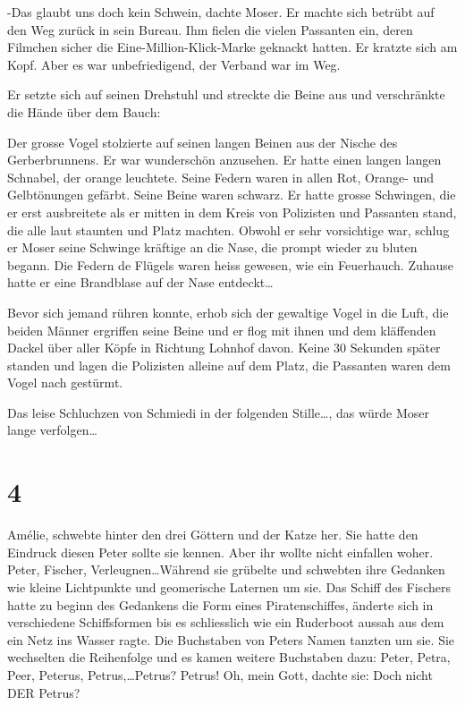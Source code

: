 \documentclass[11pt,titlepage,a5paper]{book}
\begin{document}
-Das glaubt uns doch kein Schwein, dachte Moser. Er machte sich betrübt auf den Weg zurück in sein Bureau. Ihm fielen die vielen Passanten ein, deren Filmchen sicher die Eine-Million-Klick-Marke geknackt hatten. Er kratzte sich am Kopf. Aber es war unbefriedigend, der Verband war im Weg.

Er setzte sich auf seinen Drehstuhl und streckte die Beine aus und verschränkte die Hände über dem Bauch: 

Der grosse Vogel stolzierte auf seinen langen Beinen aus der Nische des Gerberbrunnens. Er war wunderschön anzusehen. Er hatte einen langen langen Schnabel, der orange leuchtete. Seine Federn waren in allen Rot, Orange- und Gelbtönungen gefärbt. Seine Beine waren schwarz. Er hatte grosse Schwingen, die er erst ausbreitete als er mitten in dem Kreis von Polizisten und Passanten stand, die alle laut staunten und Platz machten. Obwohl er sehr vorsichtige war, schlug er Moser seine Schwinge kräftige an die Nase, die prompt wieder zu bluten begann. Die Federn de Flügels waren heiss gewesen, wie ein Feuerhauch. Zuhause hatte er eine Brandblase auf der Nase entdeckt\dots

Bevor sich jemand rühren konnte, erhob sich der gewaltige Vogel in die Luft, die beiden Männer ergriffen seine Beine und er flog mit ihnen und dem kläffenden Dackel über aller Köpfe in Richtung Lohnhof davon. Keine 30 Sekunden später standen und lagen die Polizisten alleine auf dem Platz, die Passanten waren dem Vogel nach gestürmt. 

Das leise Schluchzen von Schmiedi in der folgenden Stille\dots, das würde Moser lange verfolgen\dots

\section*{4}

Amélie, schwebte hinter den drei Göttern und der Katze her. Sie hatte den Eindruck diesen Peter sollte sie kennen. Aber ihr wollte nicht einfallen woher. Peter, Fischer, Verleugnen\dots Während sie grübelte und schwebten ihre Gedanken wie kleine Lichtpunkte und geomerische Laternen um sie. Das Schiff des Fischers hatte zu beginn des Gedankens die Form eines Piratenschiffes, änderte sich in verschiedene Schiffsformen bis es schliesslich wie ein Ruderboot aussah aus dem ein Netz ins Wasser ragte. Die Buchstaben von Peters Namen tanzten um sie. Sie wechselten die Reihenfolge und es kamen weitere Buchstaben dazu: Peter, Petra, Peer, Peterus, Petrus,\dots Petrus? Petrus! Oh, mein Gott, dachte sie: Doch nicht DER Petrus?
\end{document}
